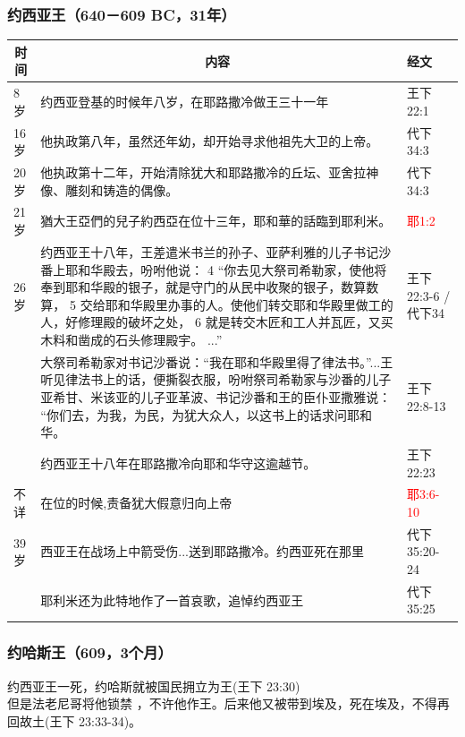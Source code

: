 \subsubsection{约西亚王（640－609 BC，31年）}
\begin{table}[H]
\centering
\begin{tabular}{p{1.4cm}|p{13.40cm}|p{2.20cm}}\hline\hline
\multicolumn{1}{c|}{时间}&\multicolumn{1}{c|}{内容}&经文\\\hline
8岁&约西亚登基的时候年八岁，在耶路撒冷做王三十一年&王下22:1 \\\hline
16岁&他执政第八年，虽然还年幼，却开始寻求他祖先大卫的上帝。&代下34:3\\\hline
20岁&他执政第十二年，开始清除犹大和耶路撒冷的丘坛、亚舍拉神像、雕刻和铸造的偶像。&代下34:3\\\hline
21岁&猶大王亞們的兒子約西亞在位十三年，耶和華的話臨到耶利米。&\textcolor{red}{耶1:2}\\\hline
26岁&约西亚王十八年，王差遣米书兰的孙子、亚萨利雅的儿子书记沙番上耶和华殿去，吩咐他说： 4 “你去见大祭司希勒家，使他将奉到耶和华殿的银子，就是守门的从民中收聚的银子，数算数算， 5 交给耶和华殿里办事的人。使他们转交耶和华殿里做工的人，好修理殿的破坏之处， 6 就是转交木匠和工人并瓦匠，又买木料和凿成的石头修理殿宇。 ...”&王下22:3-6 /代下34\\\hline
&大祭司希勒家对书记沙番说：“我在耶和华殿里得了律法书。”...王听见律法书上的话，便撕裂衣服，吩咐祭司希勒家与沙番的儿子亚希甘、米该亚的儿子亚革波、书记沙番和王的臣仆亚撒雅说： “你们去，为我，为民，为犹大众人，以这书上的话求问耶和华。&王下22:8-13\\\hline
      &约西亚王十八年在耶路撒冷向耶和华守这逾越节。&王下22:23\\\hline
不详&在位的时候,责备犹大假意归向上帝&\textcolor{red}{耶3:6-10}\\\hline
39岁&西亚王在战场上中箭受伤...送到耶路撒冷。约西亚死在那里&代下35:20-24\\\hline
&耶利米还为此特地作了一首哀歌，追悼约西亚王&代下35:25\\\hline
\end{tabular}
\end{table}



\subsubsection{约哈斯王（609，3个月）}
约西亚王一死，约哈斯就被国民拥立为王(王下 23:30)\\
但是法老尼哥将他锁禁 ，不许他作王。后来他又被带到埃及，死在埃及，不得再回故土(王下 23:33-34)。

